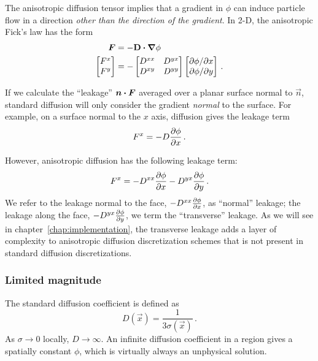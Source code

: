 The anisotropic diffusion tensor implies that a gradient in $\phi$ can induce
particle flow in a direction \emph{other than the direction of the gradient}. In
2-D, the anisotropic Fick's law has the form
\begin{align*}
  \bm{F} &= - \mathbf{D} \bm{\cdot} \bm{\nabla} \phi
  \\
  \begin{bmatrix}
    F^x \\
    F^y
  \end{bmatrix}
  &=
  -
  \begin{bmatrix}
    D^{xx} & D^{yx} \\
    D^{xy} & D^{yy}
  \end{bmatrix}
  \begin{bmatrix}
    {\partial \phi}/{\partial x} \\
    {\partial \phi}/{\partial y}
  \end{bmatrix} \,.
\end{align*}

If we calculate the ``leakage'' $\bm{n} \bm{\cdot} \bm{F}$ averaged over a planar
surface normal to $\vec{n}$, standard diffusion will only consider the gradient
\emph{normal} to the surface. For example, on a surface normal to the $x$ axis,
diffusion gives the leakage term
\begin{equation*}
  F^x = - D \frac{\partial \phi}{\partial x}\,.
\end{equation*}

However, anisotropic diffusion has the following leakage term:
\begin{equation*}
  F^x = - D^{xx} \frac{\partial \phi}{\partial x} - D^{yx} \frac{\partial \phi}{\partial y}\,.
\end{equation*}
We refer to the leakage normal to the face, $- D^{xx} \frac{\partial \phi}{\partial x}$, as
``normal'' leakage; the leakage along the face, $- D^{yx}
\frac{\partial \phi}{\partial y}$, we term the ``transverse'' leakage. As we will see in
chapter~\ref{chap:implementation}, the transverse leakage adds a layer of
complexity to anisotropic diffusion discretization schemes that is not present
in standard diffusion discretizations.

\subsubsection{Limited magnitude}
The standard diffusion coefficient is defined as
\begin{equation*}
  D(\vec{x}) = \frac{1}{3\sigma(\vec{x})} \,.
\end{equation*}
As $\sigma\to0$ locally, $D\to \infty$. An infinite diffusion coefficient in a
region gives a spatially constant $\phi$, which is virtually always an
unphysical solution.

